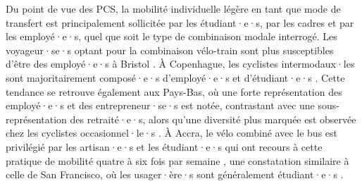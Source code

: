 \begin{refsegment}
Du point de vue des \acrshort{PCS}, la mobilité individuelle légère en tant que mode de transfert est principalement sollicitée par les étudiant·e·s, par les cadres et par les employé·e·s, quel que soit le type de combinaison modale interrogé. Les voyageur·se·s optant pour la combinaison vélo-train sont plus susceptibles d'être des employé·e·s à Bristol \textcolor{blue}{\autocite[192]{sherwin_practices_2011}}. À Copenhague, les cyclistes intermodaux·les sont majoritairement composé·e·s d'employé·e·s et d'étudiant·e·s \textcolor{blue}{\autocite[21]{halldorsdottir_home-end_2017}}. Cette tendance se retrouve également aux Pays-Bas, où une forte représentation des employé·e·s et des entrepreneur·se·s est notée, contrastant avec une sous-représentation des retraité·e·s, alors qu'une diversité plus marquée est observée chez les cyclistes occasionnel·le·s \textcolor{blue}{\autocite[9]{jonkeren_bicycle-train_2021}}. À Accra, le vélo combiné avec le bus est privilégié par les artisan·e·s et les étudiant·e·s qui ont recours à cette pratique de mobilité quatre à six fois par semaine \textcolor{blue}{\autocite[112]{quarshie_integrating_2007}}, une constatation similaire à celle de San Francisco, où les usager·ère·s sont généralement étudiant·e·s \textcolor{blue}{\autocite[94]{cervero_bike-and-ride_2013}}.%


\end{refsegment}
